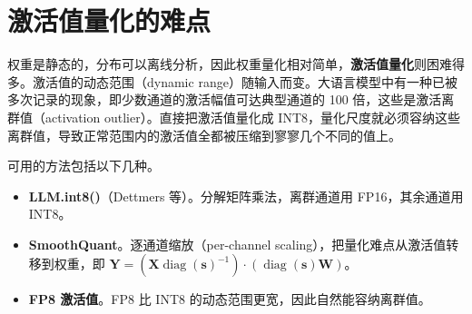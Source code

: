 \section{激活值量化的难点}

权重是静态的，分布可以离线分析，因此权重量化相对简单，\textbf{激活值量化}则困难得多。激活值的动态范围（dynamic range）随输入而变。大语言模型中有一种已被多次记录的现象，即少数通道的激活幅值可达典型通道的 100 倍，这些是激活离群值（activation outlier）。直接把激活值量化成 INT8，量化尺度就必须容纳这些离群值，导致正常范围内的激活值全都被压缩到寥寥几个不同的值上。

可用的方法包括以下几种。

\begin{itemize}
  \item \textbf{LLM.int8()}（Dettmers 等）。分解矩阵乘法，离群通道用 FP16，其余通道用 INT8。
  \item \textbf{SmoothQuant}。逐通道缩放（per-channel scaling），把量化难点从激活值转移到权重，即
  $\mathbf{Y}=(\mathbf{X}\operatorname{diag}(\mathbf{s})^{-1})\cdot(\operatorname{diag}(\mathbf{s})\mathbf{W})$。
  \item \textbf{FP8 激活值}。FP8 比 INT8 的动态范围更宽，因此自然能容纳离群值。
\end{itemize}

